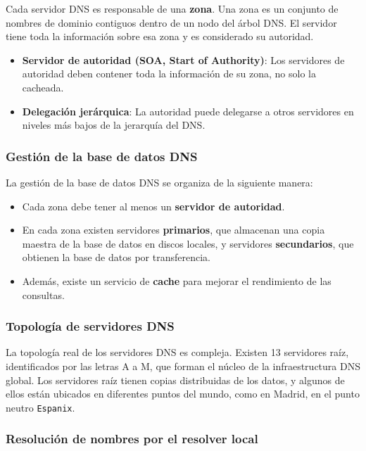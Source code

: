 \documentclass[a4paper,12pt]{article}
\begin{document}
Cada servidor DNS es responsable de una \textbf{zona}. Una zona es un conjunto de nombres de dominio contiguos dentro de un nodo del árbol DNS. El servidor tiene toda la información sobre esa zona y es considerado su autoridad.

\begin{itemize}
    \item \textbf{Servidor de autoridad (SOA, Start of Authority)}: Los servidores de autoridad deben contener toda la información de su zona, no solo la cacheada.
    \item \textbf{Delegación jerárquica}: La autoridad puede delegarse a otros servidores en niveles más bajos de la jerarquía del DNS.
\end{itemize}

\subsubsection{Gestión de la base de datos DNS}

La gestión de la base de datos DNS se organiza de la siguiente manera:

\begin{itemize}
    \item Cada zona debe tener al menos un \textbf{servidor de autoridad}.
    \item En cada zona existen servidores \textbf{primarios}, que almacenan una copia maestra de la base de datos en discos locales, y servidores \textbf{secundarios}, que obtienen la base de datos por transferencia.
    \item Además, existe un servicio de \textbf{cache} para mejorar el rendimiento de las consultas.
\end{itemize}

\subsubsection{Topología de servidores DNS}

La topología real de los servidores DNS es compleja. Existen 13 servidores raíz, identificados por las letras A a M, que forman el núcleo de la infraestructura DNS global. Los servidores raíz tienen copias distribuidas de los datos, y algunos de ellos están ubicados en diferentes puntos del mundo, como en Madrid, en el punto neutro \texttt{Espanix}.

\subsubsection{Resolución de nombres por el resolver local}
\end{document}
